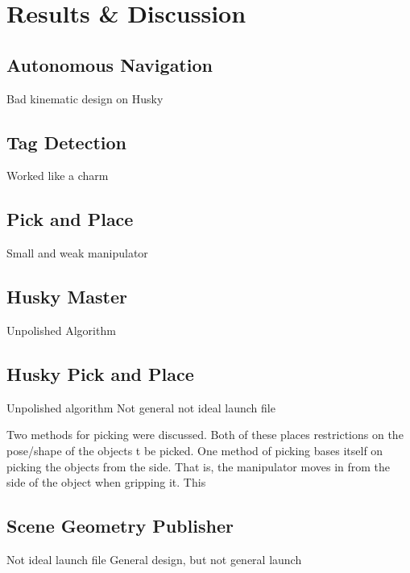 \chapter{Results \& Discussion}

\section{Autonomous Navigation}
Bad kinematic design on Husky

\section{Tag Detection}
Worked like a charm

\section{Pick and Place}
Small and weak manipulator

\section{Husky Master}
 Unpolished Algorithm

 \section{Husky Pick and Place}
 Unpolished algorithm
 Not general
 not ideal launch file
 
 Two methods for picking were discussed. Both of these places restrictions on the pose/shape of the objects t be picked. One method of picking bases itself on picking the objects from the side. That is, the manipulator moves in from the side of the object when gripping it. This 

 \section{Scene Geometry Publisher}
 Not ideal launch file
 General design, but not general launch